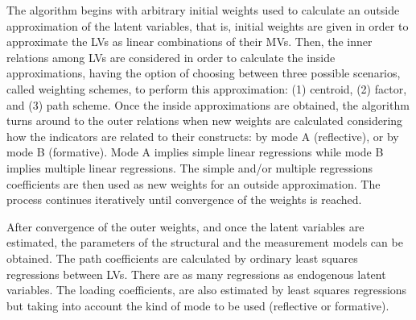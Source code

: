 \documentclass[12pt]{book}\usepackage{graphicx, color}
\begin{document}
The algorithm begins with arbitrary initial weights used to calculate an outside approximation of the latent variables, that is, initial weights are given in order to approximate the LVs as linear combinations of their MVs. Then, the inner relations among LVs are considered in order to calculate the inside approximations, having the option of choosing between three possible scenarios, called weighting schemes, to perform this approximation: (1) centroid, (2) factor, and (3) path scheme. Once the inside approximations are obtained, the algorithm turns around to the outer relations when new weights are calculated considering how the indicators are related to their constructs: by mode A (reflective), or by mode B (formative). Mode A implies simple linear regressions while mode B implies multiple linear regressions. The simple and/or multiple regressions coefficients are then used as new weights for an outside approximation. The process continues iteratively until convergence of the weights is reached.

After convergence of the outer weights, and once the latent variables are estimated, the parameters of the structural and the measurement models can be obtained. The path coefficients are calculated by ordinary least squares regressions between LVs. There are as many regressions as endogenous latent variables. The loading coefficients, are also estimated by least squares regressions but taking into account the kind of mode to be used (reflective or formative).
\end{document}

